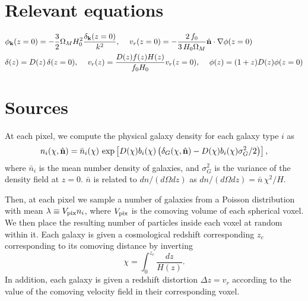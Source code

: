 \documentclass[a4paper,10pt]{article}
\begin{document}
\section{Relevant equations}
  \begin{align}
    &\phi_{\bf k}(z=0)=-\frac{3}{2}\Omega_MH_0^2
    \frac{\delta_{\bf k}(z=0)}{k^2},\hspace{12pt}
    v_r(z=0)=-\frac{2\,f_0}{3\,H_0\Omega_M}\hat{\bf n}\cdot\nabla\phi(z=0)\\
    &\delta(z)=D(z)\,\delta(z=0),\hspace{12pt}
    v_r(z)=\frac{D(z)f(z)H(z)}{f_0H_0}v_r(z=0),\hspace{12pt}
    \phi(z)=(1+z)D(z)\phi(z=0)
  \end{align}

\section{Sources}
  At each pixel, we compute the physical galaxy density for each galaxy
  type $i$ as
  \begin{equation}
    n_i(\chi,\hat{\bf n})=
    \bar{n}_i(\chi)\,
    \exp\left[D(\chi)b_i(\chi)\left(\delta_G(\chi,\hat{\bf n})-
      D(\chi)b_i(\chi)\sigma_G^2/2\right)\right],
  \end{equation}
  where $\bar{n}_i$ is the mean number density of galaxies, and $\sigma_G^2$
  is the variance of the density field at $z=0$. $\bar{n}$ is related to
  $dn/(d\Omega dz)$ as $dn/(d\Omega dz)=\bar{n}\,\chi^2/H$.

  Then, at each pixel we sample a number of galaxies from a Poisson distribution with mean
  $\lambda\equiv V_{\rm pix}n_i$, where $V_{\rm pix}$ is the comoving volume of each
  spherical voxel. We then place the resulting number of particles inside each voxel at
  random within it. Each galaxy is given a cosmological redshift corresponding $z_c$
  corresponding to its comoving distance by inverting
  \begin{equation}
    \chi=\int_0^{z_c}\frac{dz}{H(z)}.
  \end{equation}
  In addition, each galaxy is given a redshift distortion $\Delta z=v_r$ according to the
  value of the comoving velocity field in their corresponding voxel.
\end{document}
